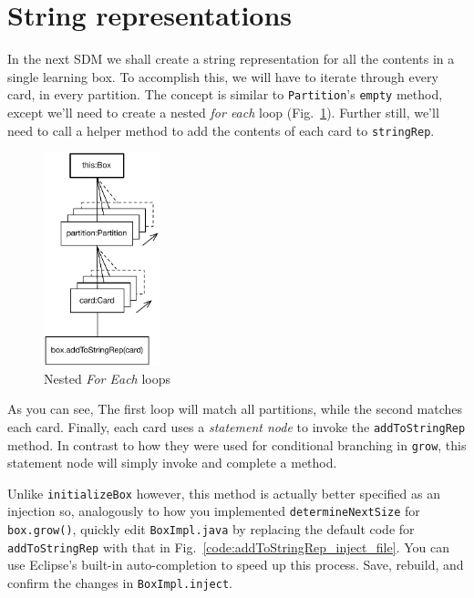 \newpage
\hypertarget{sec:stringRep}{}
\section{String representations}
\genHeader

In the next SDM we shall create a string representation for all the contents in a single learning box. To accomplish this, we will have to iterate through 
every card, in every partition. The concept is similar to \texttt{Partition}'s \texttt{empty} method, except we'll need to create a nested \emph{for each}
loop (Fig.~\ref{fig:goal_stringRep}). Further still, we'll need to call a helper method to add the contents of each card to \texttt{stringRep}.

\vspace{1cm}

\begin{figure}[htbp]
	\centering
	\includegraphics[width=0.3\textwidth]{goal_stringRep.pdf}
	\caption{Nested \emph{For Each} loops}
	\label{fig:goal_stringRep}
\end{figure}

\vspace{1cm}

As you can see, The first loop will match all partitions, while the second matches each card. Finally, each card uses a \emph{statement node} to invoke the
\texttt{addToStringRep} method. In contrast to how they were used for conditional branching in \texttt{grow}, this statement node will simply invoke and
complete a method.

Unlike \texttt{initializeBox} however, this method is actually better specified as an injection so, analogously to how you implemented
\texttt{determineNextSize} for \texttt{box.grow()}, quickly edit \texttt{BoxImpl.java} by replacing the default code for \texttt{addToStringRep} with that
in Fig.~\ref{code:addToStringRep_inject_file}. You can use Eclipse's built-in auto-completion to speed up this process. Save, rebuild, and confirm the changes
in \texttt{BoxImpl.inject}.

